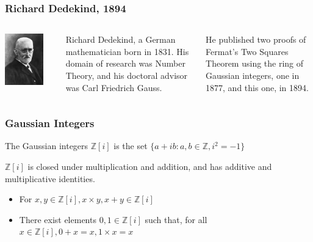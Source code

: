 \documentclass{beamer}
\begin{document}
\begin{frame}
	\frametitle{Richard Dedekind, 1894}
	\begin{columns}
		\begin{center}
			\includegraphics[width=0.8\textwidth]{Richard_Dedekind_1900s.jpg}
		\end{center}
		Richard Dedekind, a German mathematician born in 1831.
		His domain of research was Number Theory, and his doctoral advisor was
		Carl Friedrich Gauss.
		
		He published two proofs of Fermat's Two Squares Theorem using the ring of
		Gaussian integers, one in 1877, and this one, in 1894.

	\end{columns}
\end{frame}

\begin{frame}
	\frametitle{Gaussian Integers}
	The Gaussian integers $\mathbb{Z}[i]$ is the set 
	$\{a+ib:a, b \in \mathbb{Z}, i^2 = -1 \}$

	$\mathbb{Z}[i]$ is closed under multiplication and addition, and has additive and
	multiplicative identities.
	\begin{itemize}
		\item For $x,y \in \mathbb{Z}[i], x \times y, x + y \in \mathbb{Z}[i]$
		\item There exist elements $0, 1 \in \mathbb{Z}[i]$ such that, for all
			$x \in \mathbb{Z}[i], 0+x = x, 1 \times x = x$
	\end{itemize}
\end{frame}
\end{document}
